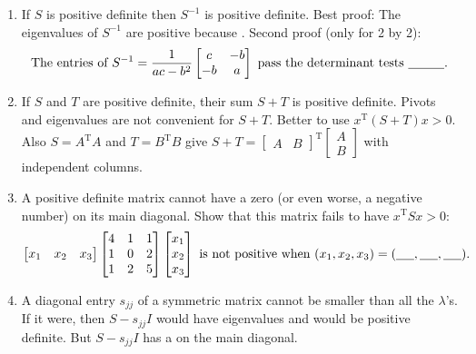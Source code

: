 \documentclass[14pt, a4paper]{article}
\begin{document}
\begin{enumerate}[resume]
    \item If $S$ is positive definite then $S^{-1}$ is positive definite. Best proof: The eigenvalues of $S^{-1}$ are positive because \underline{\hspace{1cm}}. Second proof (only for 2 by 2):
          \[
              \text{The entries of } S^{-1} = \frac{1}{ac - b^2} \begin{bmatrix} c & -b \\ -b & a \end{bmatrix} \text{ pass the determinant tests \underline{\hspace{1cm}}}.
          \]

    \item If $S$ and $T$ are positive definite, their sum $S + T$ is positive definite. Pivots and eigenvalues are not convenient for $S + T$. Better to use $x^{\mathrm{T}}(S + T)x > 0$. Also $S = A^{\mathrm{T}}A$ and $T = B^{\mathrm{T}}B$ give $S + T = \begin{bmatrix} A & B \end{bmatrix}^{\mathrm{T}} \begin{bmatrix} A \\ B \end{bmatrix}$ with independent columns.

    \item A positive definite matrix cannot have a zero (or even worse, a negative number) on its main diagonal. Show that this matrix fails to have $x^{\mathrm{T}}Sx > 0$:
          \[
              \begin{bmatrix} x_1 & x_2 & x_3 \end{bmatrix} \begin{bmatrix} 4 & 1 & 1 \\ 1 & 0 & 2 \\ 1 & 2 & 5 \end{bmatrix} \begin{bmatrix} x_1 \\ x_2 \\ x_3 \end{bmatrix} \text{ is not positive when } (x_1, x_2, x_3) = (\underline{\hspace{0.5cm}}, \underline{\hspace{0.5cm}}, \underline{\hspace{0.5cm}}).
          \]

    \item A diagonal entry $s_{jj}$ of a symmetric matrix cannot be smaller than all the $\lambda$'s. If it were, then $S - s_{jj}I$ would have \underline{\hspace{1cm}} eigenvalues and would be positive definite. But $S - s_{jj}I$ has a \underline{\hspace{1cm}} on the main diagonal.


\end{enumerate}
\end{document}

